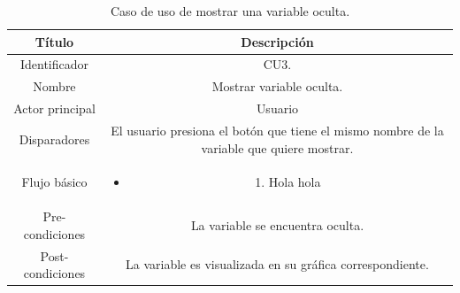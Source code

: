 \begin{table}
	\centering
	\caption{Caso de uso de mostrar una variable oculta.}
	\centering
	\begin{tabular}{c c}    
		\toprule
		\textbf{Título }     & \textbf{Descripción} \\
		\midrule
		Identificador		&	CU3. \\
		Nombre				& 	Mostrar variable oculta. \\
		Actor principal		&   Usuario \\
		Disparadores		&   El usuario presiona el botón que tiene el mismo nombre de la variable que quiere mostrar. \\
		Flujo básico		&   \begin{itemize}
			\item{1.} Hola hola
		\end{itemize}\\
		Pre-condiciones		&   La variable se encuentra oculta. \\
		Post-condiciones	&   La variable es visualizada en su gráfica correspondiente.\\
		\bottomrule
	\end{tabular}
\label{tab:caso-mostrar}
\end{table}


